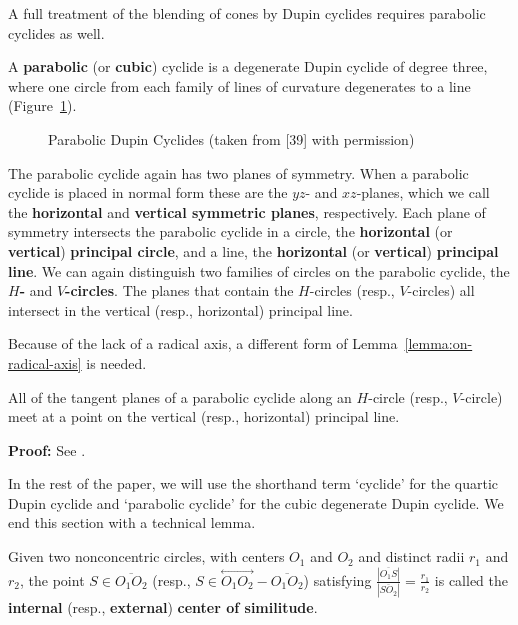 A full treatment of the blending of cones by Dupin cyclides requires
parabolic cyclides as well.

\begin{definition}
A {\bf parabolic} (or {\bf cubic}) cyclide is a degenerate Dupin cyclide
of degree three, where one circle from each family of lines of curvature
degenerates to a line (Figure~\ref{fig:den-cyclides}).
\end{definition}

\begin{figure}
\vspace{12cm}
\caption{Parabolic Dupin Cyclides (taken from [39] with permission)}
\label{fig:den-cyclides}
\end{figure}

\begin{definition}
The parabolic cyclide again has two planes of symmetry.
When a parabolic cyclide is placed in normal form
these are the $yz$- and $xz$-planes, which we call the {\bf horizontal}
and {\bf vertical symmetric planes}, respectively.
Each plane of symmetry intersects the parabolic cyclide in a circle,
the {\bf horizontal} (or {\bf vertical}) {\bf principal circle},
and a line, the {\bf horizontal} (or {\bf vertical}) {\bf principal line}.
We can again distinguish two families of circles on the parabolic cyclide,
the {\bf $H$-} and {\bf $V$-circles}.
The planes that contain the $H$-circles (resp., $V$-circles)
all intersect in the vertical (resp., horizontal) principal line.
\end{definition}

Because of the lack of a radical axis, 
a different form of Lemma~\ref{lemma:on-radical-axis} is needed.

\begin{lemma}
\label{lemma:on-principal-line}
     All of the tangent planes of a parabolic 
cyclide along an $H$-circle (resp., 
$V$-circle) meet at a point on the vertical (resp., horizontal) principal line.
\end{lemma}
{\bf Proof:} See \cite[Lemma~5.4]{shenethesis}. 
\QED

In the rest of the paper, we will use the shorthand term
`cyclide' for the quartic Dupin cyclide and
`parabolic cyclide' for the cubic degenerate Dupin cyclide.
We end this section with a technical lemma.

\begin{definition}
\label{defn:cofs}
     Given two nonconcentric circles, with centers $O_1$ and $O_2$ and 
distinct radii $r_1$ and $r_2$, the point $S\in\overline{O_1O_2}$
(resp., $S \in \stackrel{\longleftrightarrow}{O_1O_2}-\overline{O_1O_2}$) 
satisfying 
$\frac{|\overline{O_1S}|}{|\overline{SO_2}|}=\frac{r_1}{r_2}$ is called the
{\bf internal} (resp., {\bf external}) {\bf center of similitude}.  
\end{definition}

